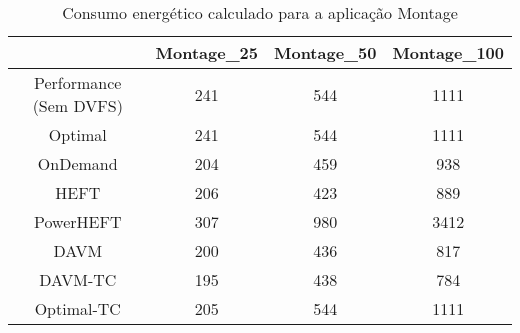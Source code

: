 \begin{table}
	\centering
    \begin{tabular}{c|ccc}
    ~                      & Montage\_25 & Montage\_50 & Montage\_100 \\ \hline
    Performance (Sem DVFS) & 241        & 544        & 1111        \\
    \cite{guerout:energy_aware_simulation} Optimal      & 241        & 544        & 1111        \\
    \cite{guerout:energy_aware_simulation} OnDemand     & 204        & 459        & 938         \\
    HEFT                   & 206        & 423        & 889         \\
    PowerHEFT              & 307        & 980        & 3412        \\
    DAVM                   & 200        & 436        & 817         \\
    DAVM-TC                & 195        & 438        & 784         \\
    Optimal-TC             & 205        & 544        & 1111        \\
    \end{tabular}
    \caption{Consumo energético calculado para a aplicação Montage}
    \label{tab:montage_energia}
\end{table}

